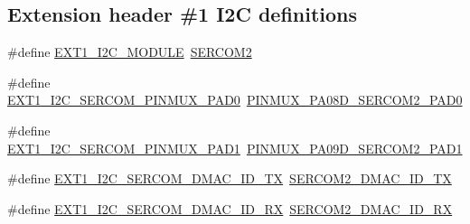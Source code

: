 \subsection*{Extension header \#1 I2C definitions}
\begin{DoxyCompactItemize}
\item 
\#define \mbox{\hyperlink{group__samd21__xplained__pro__features__group_ga9a770caae803fb3f8ae9e01beee386b6}{E\+X\+T1\+\_\+\+I2\+C\+\_\+\+M\+O\+D\+U\+LE}}~\mbox{\hyperlink{group___s_a_m_d21_j18_a__base_ga918e4c85993961a115bb23b4bb73a87f}{S\+E\+R\+C\+O\+M2}}
\item 
\#define \mbox{\hyperlink{group__samd21__xplained__pro__features__group_ga3cdd9e4076911af8036c6a0d01159136}{E\+X\+T1\+\_\+\+I2\+C\+\_\+\+S\+E\+R\+C\+O\+M\+\_\+\+P\+I\+N\+M\+U\+X\+\_\+\+P\+A\+D0}}~\mbox{\hyperlink{pio_2samd21j18a_8h_abe10d951128e796cb99f36d5c5489dda}{P\+I\+N\+M\+U\+X\+\_\+\+P\+A08\+D\+\_\+\+S\+E\+R\+C\+O\+M2\+\_\+\+P\+A\+D0}}
\item 
\#define \mbox{\hyperlink{group__samd21__xplained__pro__features__group_ga3b37203ab3cba84dcef2e7bc8a41530e}{E\+X\+T1\+\_\+\+I2\+C\+\_\+\+S\+E\+R\+C\+O\+M\+\_\+\+P\+I\+N\+M\+U\+X\+\_\+\+P\+A\+D1}}~\mbox{\hyperlink{pio_2samd21j18a_8h_adbd76732457e667e3b04123a950bcfc1}{P\+I\+N\+M\+U\+X\+\_\+\+P\+A09\+D\+\_\+\+S\+E\+R\+C\+O\+M2\+\_\+\+P\+A\+D1}}
\item 
\#define \mbox{\hyperlink{group__samd21__xplained__pro__features__group_gade9cb5e26f46927f2ce22356af69d96d}{E\+X\+T1\+\_\+\+I2\+C\+\_\+\+S\+E\+R\+C\+O\+M\+\_\+\+D\+M\+A\+C\+\_\+\+I\+D\+\_\+\+TX}}~\mbox{\hyperlink{sercom2_8h_a18e80edc1d1852734d9542e87c7cc485}{S\+E\+R\+C\+O\+M2\+\_\+\+D\+M\+A\+C\+\_\+\+I\+D\+\_\+\+TX}}
\item 
\#define \mbox{\hyperlink{group__samd21__xplained__pro__features__group_gaec8b03dc380c4b05b0205ddeba9cb72c}{E\+X\+T1\+\_\+\+I2\+C\+\_\+\+S\+E\+R\+C\+O\+M\+\_\+\+D\+M\+A\+C\+\_\+\+I\+D\+\_\+\+RX}}~\mbox{\hyperlink{sercom2_8h_adbdd3a084fc9f85a052c316d917e46ac}{S\+E\+R\+C\+O\+M2\+\_\+\+D\+M\+A\+C\+\_\+\+I\+D\+\_\+\+RX}}
\end{DoxyCompactItemize}
